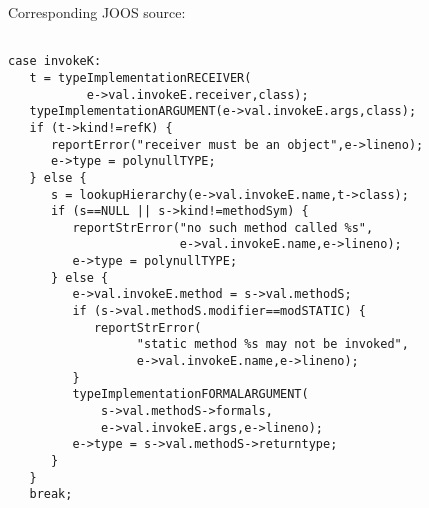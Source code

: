 \begin{slide*}
Corresponding JOOS source:
 
\begin{scriptsize}
\begin{verbatim}
 
case invokeK:
   t = typeImplementationRECEIVER(
           e->val.invokeE.receiver,class);
   typeImplementationARGUMENT(e->val.invokeE.args,class);
   if (t->kind!=refK) {
      reportError("receiver must be an object",e->lineno);
      e->type = polynullTYPE;
   } else {
      s = lookupHierarchy(e->val.invokeE.name,t->class);
      if (s==NULL || s->kind!=methodSym) {
         reportStrError("no such method called %s",
                        e->val.invokeE.name,e->lineno);
         e->type = polynullTYPE;
      } else {
         e->val.invokeE.method = s->val.methodS;
         if (s->val.methodS.modifier==modSTATIC) {
            reportStrError(
                  "static method %s may not be invoked",
                  e->val.invokeE.name,e->lineno);
         }
         typeImplementationFORMALARGUMENT(
             s->val.methodS->formals,
             e->val.invokeE.args,e->lineno);
         e->type = s->val.methodS->returntype;
      }
   }
   break;
\end{verbatim}
\end{scriptsize}
\vfil
\end{slide*}

